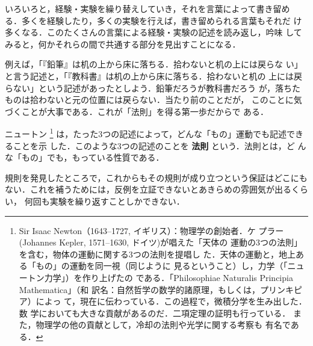             いろいろと，経験・実験を繰り替えしていき，それを言葉によって書き留め
            る．多くを経験したり，多くの実験を行えば，書き留められる言葉もそれだ
            け多くなる．このたくさんの言葉による経験・実験の記述を読み返し，吟味
            してみると，何かそれらの間で共通する部分を見出すことになる．

            例えば，「『鉛筆』は机の上から床に落ちる．拾わないと机の上には戻らな
            い」と言う記述と，「『教科書』は机の上から床に落ちる．拾わないと机の
            上には戻らない」という記述があったとしよう．鉛筆だろうが教科書だろう
            が，落ちたものは拾わないと元の位置には戻らない．当たり前のことだが，
            このことに気づくことが大事である．これが「法則」を得る第一歩だからで
            ある．

            ニュートン
                \footnote{
                    Sir Isaac Newton（1643--1727, イギリス）：物理学の創始者．ケ
                    プラー(Johannes Kepler, 1571--1630, ドイツ)が唱えた「天体の
                    運動の3つの法則」を含む，物体の運動に関する3つの法則を提唱し
                    た．天体の運動と，地上ある「もの」の運動を同一視（同じように
                    見るということ）し，力学（「ニュートン力学」）を作り上げたの
                    である．「Philosophiae Naturalis Principia Mathematica」（和
                    訳名：自然哲学の数学的諸原理，もしくは，プリンキピア）によっ
                    て，現在に伝わっている．この過程で，微積分学を生み出した．数
                    学においても大きな貢献があるのだ．二項定理の証明も行っている．
                    また，物理学の他の貢献として，冷却の法則や光学に関する考察も
                    有名である．
                }
            は，たった3つの記述によって，どんな「もの」運動でも記述できることを示
            した．このような3つの記述のことを \textbf{法則} という．法則とは，ど
            んな「もの」でも，もっている性質である．

            規則を発見したところで，これからもその規則が成り立つという保証はどこにも
            ない．これを補うためには，反例を立証できないとあきらめの雰囲気が出るくらい，
            何回も実験を繰り返すことしかできない．

